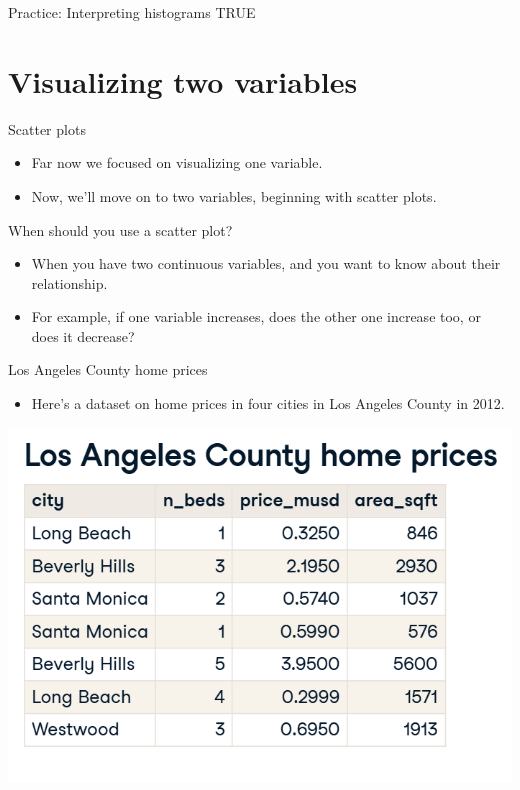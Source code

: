 \documentclass[
  ignorenonframetext,
]{beamer}
\providecommand{\tightlist}{%
  \setlength{\itemsep}{0pt}\setlength{\parskip}{0pt}}
\begin{document}
\begin{frame}{Practice: Interpreting histograms}
\label{practice-interpreting-histograms-23}
TRUE
\end{frame}

\section{Visualizing two variables}\label{visualizing-two-variables}

\begin{frame}{Scatter plots}
\label{scatter-plots}
\begin{itemize}
\item
  Far now we focused on visualizing one variable.
\item
  Now, we'll move on to two variables, beginning with scatter plots.
\end{itemize}
\end{frame}

\begin{frame}{When should you use a scatter plot?}
\label{when-should-you-use-a-scatter-plot}
\begin{itemize}
\item
  When you have two continuous variables, and you want to know about
  their relationship.
\item
  For example, if one variable increases, does the other one increase
  too, or does it decrease?
\end{itemize}
\end{frame}

\begin{frame}{Los Angeles County home prices}
\label{los-angeles-county-home-prices}
\begin{itemize}
\tightlist
\item
  Here's a dataset on home prices in four cities in Los Angeles County
  in 2012.
\end{itemize}

\includegraphics{../images/im30.png}
\end{frame}
\end{document}
